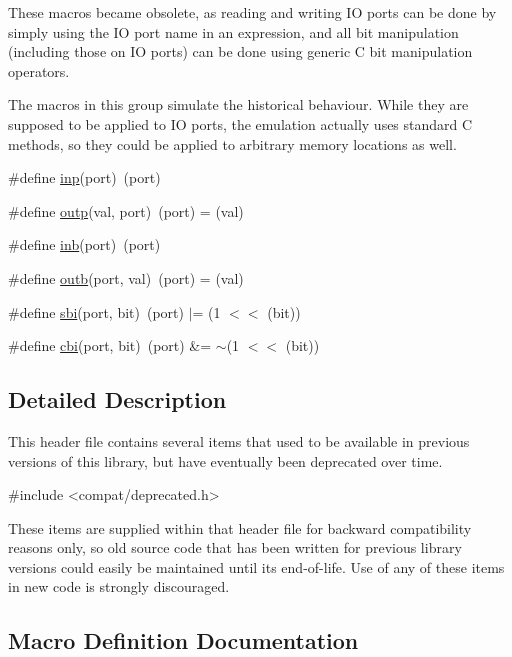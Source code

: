 These macros became obsolete, as reading and writing IO ports can be done by simply using the IO port name in an expression, and all bit manipulation (including those on IO ports) can be done using generic C bit manipulation operators.

The macros in this group simulate the historical behaviour. While they are supposed to be applied to IO ports, the emulation actually uses standard C methods, so they could be applied to arbitrary memory locations as well. \begin{DoxyCompactItemize}
\item 
\#define \hyperlink{group__deprecated__items_ga5cfa4750a0633c34c7a361d8fd62c042}{inp}(port)~(port)
\item 
\#define \hyperlink{group__deprecated__items_gaab324bd721e821e275f00c3478e240c9}{outp}(val,  port)~(port) = (val)
\item 
\#define \hyperlink{group__deprecated__items_gad6488a48837d179b1833e2f48dac9665}{inb}(port)~(port)
\item 
\#define \hyperlink{group__deprecated__items_ga3a3b4c1ddf0c05701f933d70de330f08}{outb}(port,  val)~(port) = (val)
\item 
\#define \hyperlink{group__deprecated__items_ga014ef751e83f97569c06f3cdd888f3f7}{sbi}(port,  bit)~(port) $\vert$= (1 $<$$<$ (bit))
\item 
\#define \hyperlink{group__deprecated__items_ga08ee265dc07048dbb5a8b6c84551d520}{cbi}(port,  bit)~(port) \&= $\sim$(1 $<$$<$ (bit))
\end{DoxyCompactItemize}


\subsection{Detailed Description}
This header file contains several items that used to be available in previous versions of this library, but have eventually been deprecated over time.


\begin{DoxyCode}
\textcolor{preprocessor}{#include <compat/deprecated.h>} 
\end{DoxyCode}


These items are supplied within that header file for backward compatibility reasons only, so old source code that has been written for previous library versions could easily be maintained until its end-\/of-\/life. Use of any of these items in new code is strongly discouraged. 

\subsection{Macro Definition Documentation}
